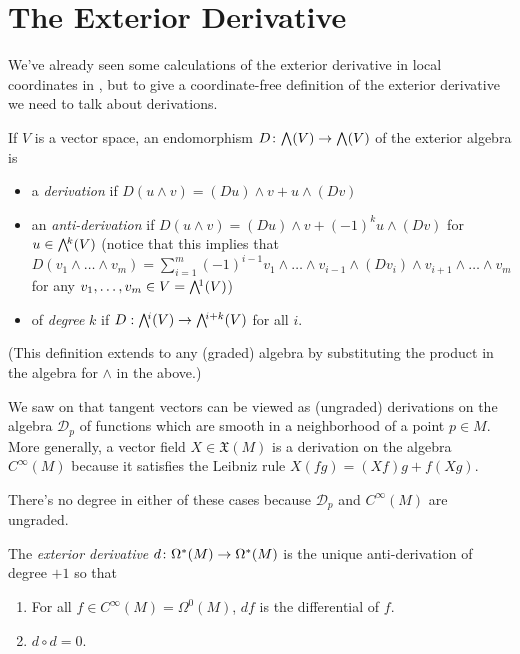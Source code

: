 
\section{The Exterior Derivative}

We've already seen some calculations of the exterior derivative in local coordinates in , but to give a coordinate-free definition of the exterior derivative we need to talk about derivations.

\begin{definition}\label{def:derivation}
	If $V$ is a vector space, an endomorphism $D\from \ext{}(V) \to \ext{}(V)$ of the exterior algebra is
	\begin{itemize}
		\item a \emph{derivation} if $D(u \wedge v) = (Du) \wedge v + u \wedge (Dv)$
		\item an \emph{anti-derivation} if $D(u\wedge v) = (Du) \wedge v + (-1)^k u \wedge (Dv)$ for $u \in \ext{k}(V)$ (notice that this implies that $D(v_1 \wedge \dots \wedge v_m) = \sum_{i=1}^m (-1)^{i-1} v_1 \wedge \dots \wedge v_{i-1} \wedge (D v_i) \wedge v_{i+1} \wedge \dots \wedge v_m$ for any $v_1, \dots , v_m \in V = \ext{1}(V)$)
		\item of \emph{degree} $k$ if $D: \ext{i}(V) \to \ext{i+k}(V)$ for all $i$.
	\end{itemize}
	(This definition extends to any (graded) algebra by substituting the product in the algebra for $\wedge$ in the above.)
\end{definition}

\begin{example}
	We saw on  that tangent vectors can be viewed as (ungraded) derivations on the algebra $\mathcal{D}_p$ of functions which are smooth in a neighborhood of a point $p \in M$. More generally, a vector field $X \in \mathfrak{X}(M)$ is a derivation on the algebra $C^\infty(M)$ because it satisfies the Leibniz rule $X(fg) = (Xf)g + f(Xg)$.
	
	There's no degree in either of these cases because $\mathcal{D}_p$ and $C^\infty(M)$ are ungraded.
\end{example}

\begin{definition}\label{def:exterior derivative}
	The \emph{exterior derivative} $d \colon\thinspace\! \Omega^\ast(M) \to \Omega^\ast(M)$ is the unique anti-derivation of degree $+1$ so that
	\begin{enumerate}
		\item \label{it:d_0 is differential} For all $f \in C^\infty(M) = \Omega^0(M)$, $df$ is the differential of $f$.
		\item \label{it:d^2=0} $d \circ d = 0$.
	\end{enumerate}
\end{definition}

